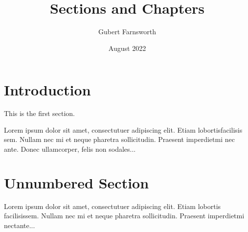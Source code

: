 \documentclass{article}
\title{Sections and Chapters}
\author{Gubert Farnsworth}
\date{August 2022}
\begin{document}
    
\maketitle

\tableofcontents

\section{Introduction}

This is the first section.

Lorem ipsum dolor sit amet, consectutuer adipiscing elit.
Etiam lobortisfacilisis sem.
Nullam nec mi et neque pharetra sollicitudin.
Praesent imperdietmi nec ante.
Donec ullamcorper, felis non sodales...

\section*{Unnumbered Section}

Lorem ipsum dolor sit amet, consectutuer adipiscing elit.
Etiam lobortis facilisissem.
Nullam nec mi et neque pharetra sollicitudin.
Praesent imperdietmi nectante...
\end{document}
